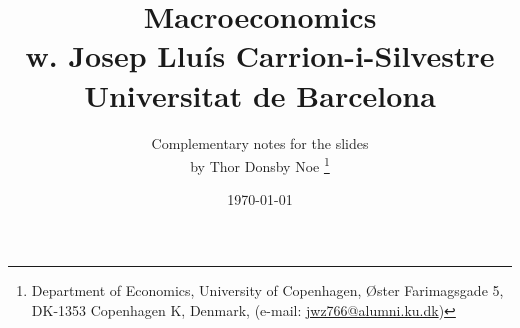
\title{\Huge Macroeconomics  \\ \Large w. Josep Lluís Carrion-i-Silvestre \\ Universitat de Barcelona} %
\author{Complementary notes for the slides \\ by Thor Donsby Noe \thanks{Department of Economics, University of Copenhagen, Øster Farimagsgade 5, DK-1353 Copenhagen K, Denmark, (e-mail: \href{mailto:jwz766@alumni.ku.dk}{jwz766@alumni.ku.dk})}
\\ [1ex]
}
\date{\today} %


%         
